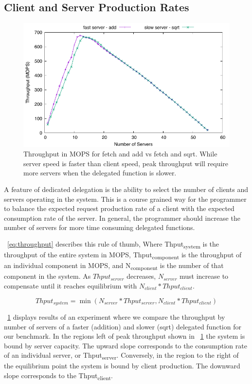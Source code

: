 \documentclass{uicthesi}
\begin{document}
\subsection{Client and Server Production Rates}
\begin{figure}[ht!]
\centering
\includegraphics[width=0.9\columnwidth]{FIG/fast_and_slow_server.pdf}
\caption{Throughput in MOPS for fetch and add vs fetch and sqrt. While server speed is faster than client speed, peak throughput will require more servers when the delegated function is slower. }
\label{fig:slow_server}
\end{figure}

A feature of dedicated delegation is the ability to select the number of clients and servers operating in the system. This is a course grained way for the programmer to balance the expected request production rate of a client with the expected consumption rate of the server. In general, the programmer should increase the number of servers for more time consuming delegated functions. 

~\ref{eq:throughput} describes this rule of thumb, Where Thput\textsubscript{system} is the throughput of the entire system in MOPS, Thput\textsubscript{component} is the throughput of an individual component in MOPS, and N\textsubscript{component} is the number of that component in the system. As $Thput_{server}$ decreases, $N_{server}$ must increase to compensate until it reaches equilibrium with $N_{client} * Thput_{client}$. 

\begin{equation}
Thput_{system} = \min(N_{server} * Thput_{server}, N_{client} * Thput_{client})
\label{eq:throughput}
\end{equation}

 ~\ref{fig:slow_server} displays results of an experiment where we compare the throughput by number of servers of a faster (addition) and slower (sqrt) delegated function for our benchmark. In the regions left of peak throughput shown in  ~\ref{fig:slow_server} the system is bound by server capacity. The upward slope corresponds to the consumption rate of an individual server, or Thput\textsubscript{server}. Conversely, in the region to the right of the equilibrium point the system is bound by client production. The downward slope corresponds to the Thput\textsubscript{client}. 
\end{document}
